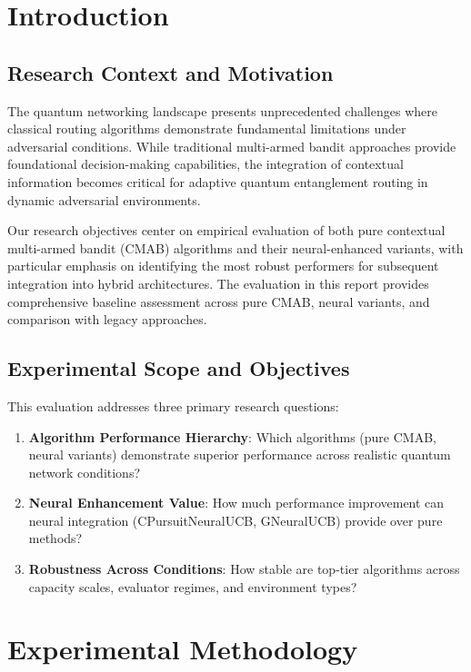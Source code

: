 \documentclass[12pt,a4paper]{article}
\begin{document}
\newpage
\section{Introduction}

\subsection{Research Context and Motivation}

The quantum networking landscape presents unprecedented challenges where classical routing algorithms demonstrate fundamental limitations under adversarial conditions. While traditional multi-armed bandit approaches provide foundational decision-making capabilities, the integration of contextual information becomes critical for adaptive quantum entanglement routing in dynamic adversarial environments.

Our research objectives center on empirical evaluation of both pure contextual multi-armed bandit (CMAB) algorithms and their neural-enhanced variants, with particular emphasis on identifying the most robust performers for subsequent integration into hybrid architectures. The evaluation in this report provides comprehensive baseline assessment across pure CMAB, neural variants, and comparison with legacy approaches.

\subsection{Experimental Scope and Objectives}

This evaluation addresses three primary research questions:

\begin{enumerate}
\item \textbf{Algorithm Performance Hierarchy}: Which algorithms (pure CMAB, neural variants) demonstrate superior performance across realistic quantum network conditions?
\item \textbf{Neural Enhancement Value}: How much performance improvement can neural integration (CPursuitNeuralUCB, GNeuralUCB) provide over pure methods?
\item \textbf{Robustness Across Conditions}: How stable are top-tier algorithms across capacity scales, evaluator regimes, and environment types?
\end{enumerate}

\section{Experimental Methodology}
\end{document}
